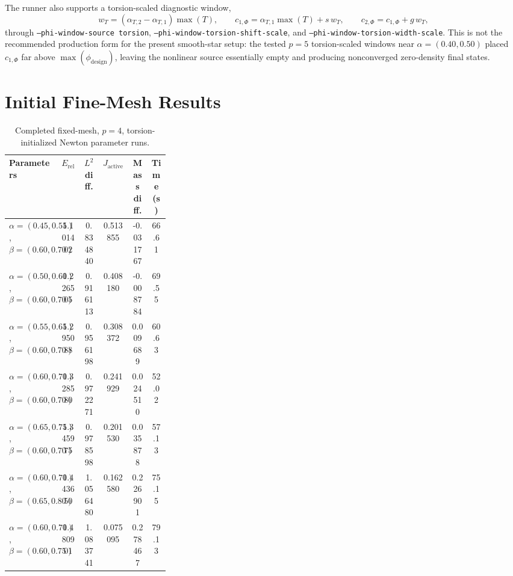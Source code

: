 \documentclass[11pt]{article}
\begin{document}
The runner also supports a torsion-scaled diagnostic window,
\[
w_T=(\alpha_{T,2}-\alpha_{T,1})\max(T),\qquad
c_{1,\Phi}=\alpha_{T,1}\max(T)+s\,w_T,\qquad
c_{2,\Phi}=c_{1,\Phi}+g\,w_T,
\]
through \texttt{--phi-window-source torsion},
\texttt{--phi-window-torsion-shift-scale}, and
\texttt{--phi-window-torsion-width-scale}.  This is not the recommended
production form for the present smooth-star setup: the tested \(p=5\)
torsion-scaled windows near \(\alpha=(0.40,0.50)\) placed \(c_{1,\Phi}\) far
above \(\max(\phi_{\mathrm{design}})\), leaving the nonlinear source
essentially empty and producing nonconverged zero-density final states.

\section{Initial Fine-Mesh Results}

\begin{table}[h]
\centering
\small
\begin{tabular}{@{}>{\raggedright\arraybackslash}p{0.31\linewidth}
                S[table-format=1.6]
                S[table-format=1.6]
                S[table-format=1.6]
                S[table-format=-1.6]
                S[table-format=2.2]@{}}
\toprule
Parameters & {$E_{\mathrm{rel}}$} & {$L^2$ diff.} & {$J_{\mathrm{active}}$} & {Mass diff.} & {Time (s)} \\
\midrule
\(\alpha=(0.45,0.55)\), \(\beta=(0.60,0.70)\) & 1.101402 & 0.834840 & 0.513855 & -0.031767 & 66.61 \\
\(\alpha=(0.50,0.60)\), \(\beta=(0.60,0.70)\) & 1.226505 & 0.916113 & 0.408180 & -0.008784 & 69.55 \\
\(\alpha=(0.55,0.65)\), \(\beta=(0.60,0.70)\) & 1.295088 & 0.956198 & 0.308372 & 0.009689 & 60.63 \\
\(\alpha=(0.60,0.70)\), \(\beta=(0.60,0.70)\) & 1.328580 & 0.972271 & 0.241929 & 0.024510 & 52.02 \\
\(\alpha=(0.65,0.75)\), \(\beta=(0.60,0.70)\) & 1.345975 & 0.978598 & 0.201530 & 0.035878 & 57.13 \\
\(\alpha=(0.60,0.70)\), \(\beta=(0.65,0.80)\) & 1.443650 & 1.056480 & 0.162580 & 0.226901 & 75.15 \\
\(\alpha=(0.60,0.70)\), \(\beta=(0.60,0.75)\) & 1.480901 & 1.083741 & 0.075095 & 0.278467 & 79.13 \\
\bottomrule
\end{tabular}
\caption{Completed fixed-mesh, \(p=4\), torsion-initialized Newton parameter runs.}
\end{table}
\end{document}
